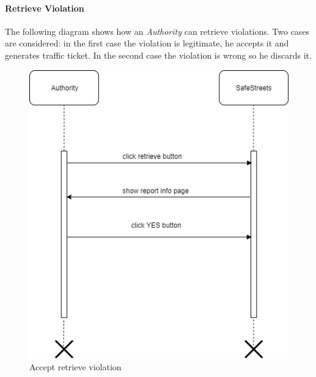 \documentclass{article}
\begin{document}
\paragraph{Retrieve Violation}
The following diagram shows how an \textit{Authority} can retrieve violations. Two cases are considered: in the 
first case the violation is legitimate, he accepts it and generates traffic ticket. In the second case the violation
is wrong so he discards it. 
\begin{figure}[H]
    \centering
    \includegraphics[scale=0.4]{img/sequence_diagrams/accept_retrieve_violation.png}
    \caption{Accept retrieve violation}
\end{figure}
\end{document}
